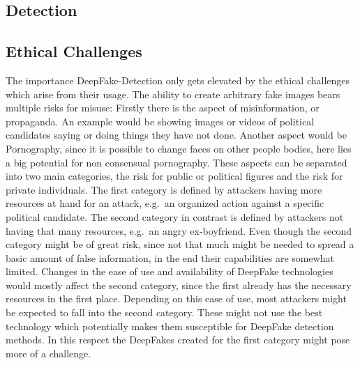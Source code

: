 \subsection{Detection}
\subsection{Ethical Challenges}
The importance DeepFake-Detection only gets elevated by the ethical challenges 
which arise from their usage. The ability to create arbitrary fake images bears
multiple risks for misuse: Firstly there is the aspect of misinformation, or
propaganda. An example would be showing images or videos of political candidates
saying or doing things they have not done. Another aspect would be Pornography,
since it is possible to change faces on other people bodies, here lies a big
potential for non consensual pornography. These aspects can be separated into
two main categories, the risk for public or political figures and the risk for
private individuals. The first category is defined by attackers having more
resources at hand for an attack, e.g.\ an organized action against a specific
political candidate. The second category in contrast is defined by attackers not
having that many resources, e.g.\ an angry ex-boyfriend. Even though the second
category might be of great risk, since not that much might be needed to spread a
basic amount of false information, in the end their capabilities are somewhat
limited. Changes in the ease of use and availability of DeepFake technologies
would mostly affect the second category, since the first already has the
necessary resources in the first place. Depending on this ease of use, most
attackers might be expected to fall into the second category. These might not
use the best technology which potentially makes them susceptible for DeepFake
detection methods. In this respect the DeepFakes created for the first category
might pose more of a challenge.
 